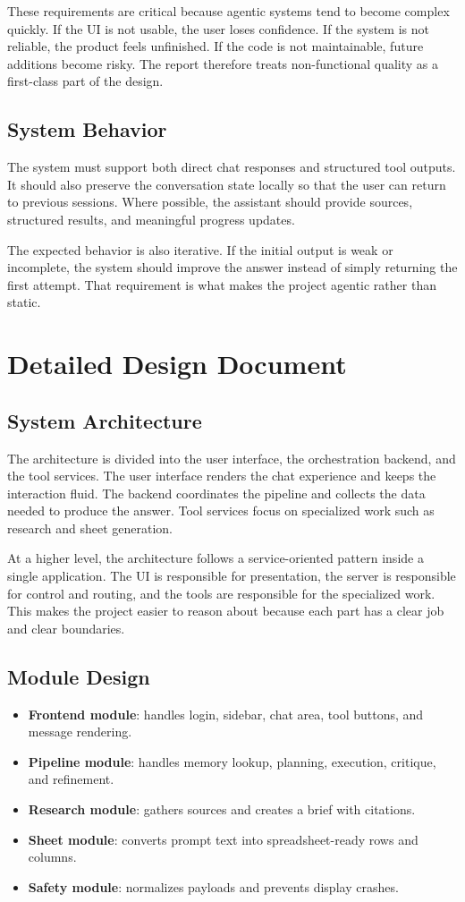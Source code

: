 \documentclass[11pt,oneside]{report}
\begin{document}
These requirements are critical because agentic systems tend to become complex quickly. If the UI is not usable, the user loses confidence. If the system is not reliable, the product feels unfinished. If the code is not maintainable, future additions become risky. The report therefore treats non-functional quality as a first-class part of the design.

\section{System Behavior}
The system must support both direct chat responses and structured tool outputs. It should also preserve the conversation state locally so that the user can return to previous sessions. Where possible, the assistant should provide sources, structured results, and meaningful progress updates.

The expected behavior is also iterative. If the initial output is weak or incomplete, the system should improve the answer instead of simply returning the first attempt. That requirement is what makes the project agentic rather than static.

\chapter{Detailed Design Document}
\section{System Architecture}
The architecture is divided into the user interface, the orchestration backend, and the tool services. The user interface renders the chat experience and keeps the interaction fluid. The backend coordinates the pipeline and collects the data needed to produce the answer. Tool services focus on specialized work such as research and sheet generation.

At a higher level, the architecture follows a service-oriented pattern inside a single application. The UI is responsible for presentation, the server is responsible for control and routing, and the tools are responsible for the specialized work. This makes the project easier to reason about because each part has a clear job and clear boundaries.

\section{Module Design}
\begin{itemize}[leftmargin=1.2cm]
  \item \textbf{Frontend module}: handles login, sidebar, chat area, tool buttons, and message rendering.
  \item \textbf{Pipeline module}: handles memory lookup, planning, execution, critique, and refinement.
  \item \textbf{Research module}: gathers sources and creates a brief with citations.
  \item \textbf{Sheet module}: converts prompt text into spreadsheet-ready rows and columns.
  \item \textbf{Safety module}: normalizes payloads and prevents display crashes.
\end{itemize}
\end{document}
